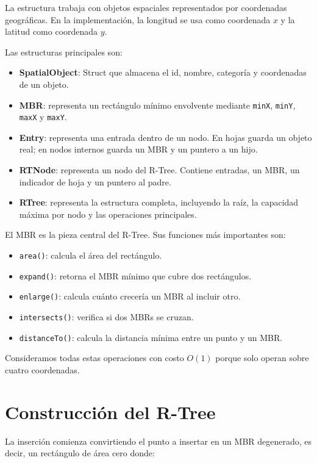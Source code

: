 \documentclass[11pt,a4paper]{article}
\begin{document}
La estructura trabaja con objetos espaciales representados por coordenadas geográficas. En la implementación, la longitud se usa como coordenada $x$ y la latitud como coordenada $y$.

Las estructuras principales son:

\begin{itemize}
    \item \textbf{SpatialObject}: Struct que almacena el id, nombre, categoría y coordenadas de un objeto.
    \item \textbf{MBR}: representa un rectángulo mínimo envolvente mediante \texttt{minX}, \texttt{minY}, \texttt{maxX} y \texttt{maxY}.
    \item \textbf{Entry}: representa una entrada dentro de un nodo. En hojas guarda un objeto real; en nodos internos guarda un MBR y un puntero a un hijo.
    \item \textbf{RTNode}: representa un nodo del R-Tree. Contiene entradas, un MBR, un indicador de hoja y un puntero al padre.
    \item \textbf{RTree}: representa la estructura completa, incluyendo la raíz, la capacidad máxima por nodo y las operaciones principales.
\end{itemize}

El MBR es la pieza central del R-Tree. Sus funciones más importantes son:

\begin{itemize}
    \item \texttt{area()}: calcula el área del rectángulo.
    \item \texttt{expand()}: retorna el MBR mínimo que cubre dos rectángulos.
    \item \texttt{enlarge()}: calcula cuánto crecería un MBR al incluir otro.
    \item \texttt{intersects()}: verifica si dos MBRs se cruzan.
    \item \texttt{distanceTo()}: calcula la distancia mínima entre un punto y un MBR.
\end{itemize}

Consideramos todas estas operaciones con costo $O(1)$ porque solo operan sobre cuatro coordenadas.

\section{Construcción del R-Tree}

La inserción comienza convirtiendo el punto a insertar en un MBR degenerado, es decir, un rectángulo de área cero donde:
\end{document}
